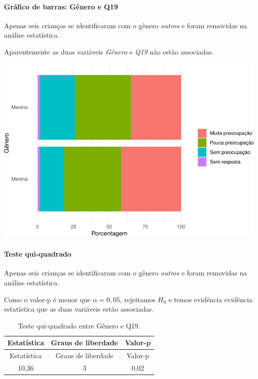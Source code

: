 \documentclass[]{article}
\let\oldparagraph\paragraph
\renewcommand{\paragraph}[1]{\oldparagraph{#1}\mbox{}}
\begin{document}
\hypertarget{gruxe1fico-de-barras-guxeanero-e-q19}{%
\paragraph{Gráfico de barras: Gênero e Q19}\label{gruxe1fico-de-barras-guxeanero-e-q19}}

Apenas seis crianças se identificaram com o gênero \emph{outros} e foram removidas na análise estatística.

Aparentemente as duas variáveis \emph{Gênero} e \emph{Q19} não estão associadas.

\begin{center}\includegraphics[width=0.75\linewidth]{relatorio_files/figure-latex/unnamed-chunk-258-1} \end{center}

\hypertarget{teste-qui-quadrado-28}{%
\paragraph{Teste qui-quadrado}\label{teste-qui-quadrado-28}}

Apenas seis crianças se identificaram com o gênero \emph{outros} e foram removidas na análise estatística.

Como o valor-p é menor que \(\alpha=0,05\), rejeitamos \(H_0\) e temos evidência evidência estatística que as duas variáveis estão associadas.

\begin{longtable}[]{@{}ccc@{}}
\caption{\label{tab:unnamed-chunk-259}Teste qui-quadrado entre Gênero e Q19.}\tabularnewline
\toprule
Estatística & Graus de liberdade & Valor-p\tabularnewline
\midrule
\endfirsthead
\toprule
Estatística & Graus de liberdade & Valor-p\tabularnewline
\midrule
\endhead
10,36 & 3 & 0,02\tabularnewline
\bottomrule
\end{longtable}
\end{document}
